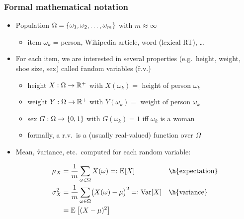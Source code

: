 \documentclass[t]{beamer} %
\begin{document}
\begin{frame}
  \frametitle{Formal mathematical notation}

  \begin{itemize}
  \item \h{Population} $\Omega = \{\omega_1, \omega_2, \ldots, \omega_m\}$
    with $m\approx \infty$
    \begin{itemize}
    \item item $\omega_k$ = person, Wikipedia article, word (lexical
      RT), \ldots
    \end{itemize}
  \item<2-> For each item, we are interested in several properties (e.g.\ height,
    weight, shoe size, sex) called \h{random variables} (\h{r.v.})
    \begin{itemize}
    \item height $X: \Omega\to \mathbb{R}^+$ with $X(\omega_k) =$ height of person $\omega_k$
    \item weight $Y: \Omega\to \mathbb{R}^+$ with $Y(\omega_k) =$ weight of person $\omega_k$
    \item sex $G: \Omega\to \{0,1\}$ with $G(\omega_k) = 1$ iff
      $\omega_k$ is a woman
    \item[\hand] formally, a r.v.\ is a (usually real-valued) function over
      $\Omega$
    \end{itemize}
  \item<3-> \h{Mean}, \h{variance}, etc.\ computed for each random variable:
    \begin{small}
    \begin{align*}
      \mu_X &= \frac{1}{m} \sum_{\omega\in \Omega} X(\omega) \eqcolon \Exp{X}
      && \text{\h{expectation}} \\
      \sigma^2_X &= \frac{1}{m} \sum_{\omega\in \Omega} \bigl( X(\omega) - \mu \bigr)^2 
      \eqcolon \Var{X}  && \text{\h{variance}} \\
      &= \Expscale{(X - \mu)^2}
    \end{align*}
    \end{small}
  \end{itemize}
  \ungap[1.5]
\end{frame}
\end{document}
